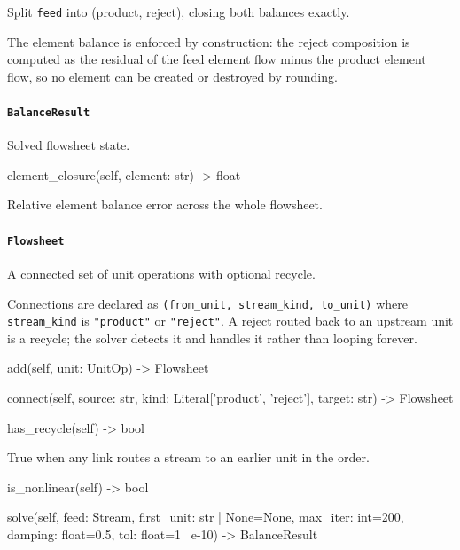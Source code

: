 \documentclass[10pt,a4paper,twoside]{report}
\begin{document}
Split \texttt{feed} into (product, reject), closing both balances exactly.

The element balance is enforced by construction: the reject composition is computed as the residual of the feed element flow minus the product element flow, so no element can be created or destroyed by rounding.

\paragraph{\texttt{BalanceResult}}

Solved flowsheet state.

\begin{verbatimsmall}
element_closure(self, element: str) -> float
\end{verbatimsmall}

Relative element balance error across the whole flowsheet.

\paragraph{\texttt{Flowsheet}}

A connected set of unit operations with optional recycle.

Connections are declared as \texttt{(from\_unit, stream\_kind, to\_unit)} where \texttt{stream\_kind} is \texttt{"product"} or \texttt{"reject"}. A reject routed back to an upstream unit is a recycle; the solver detects it and handles it rather than looping forever.

\begin{verbatimsmall}
add(self, unit: UnitOp) -> Flowsheet
\end{verbatimsmall}

\begin{verbatimsmall}
connect(self, source: str, kind: Literal['product', 'reject'], target: str) -> Flowsheet
\end{verbatimsmall}

\begin{verbatimsmall}
has_recycle(self) -> bool
\end{verbatimsmall}

True when any link routes a stream to an earlier unit in the order.

\begin{verbatimsmall}
is_nonlinear(self) -> bool
\end{verbatimsmall}

\begin{verbatimsmall}
solve(self, feed: Stream, first_unit: str | None=None, max_iter: int=200, damping: float=0.5, tol: float=1
    \ e-10) -> BalanceResult
\end{verbatimsmall}
\end{document}
